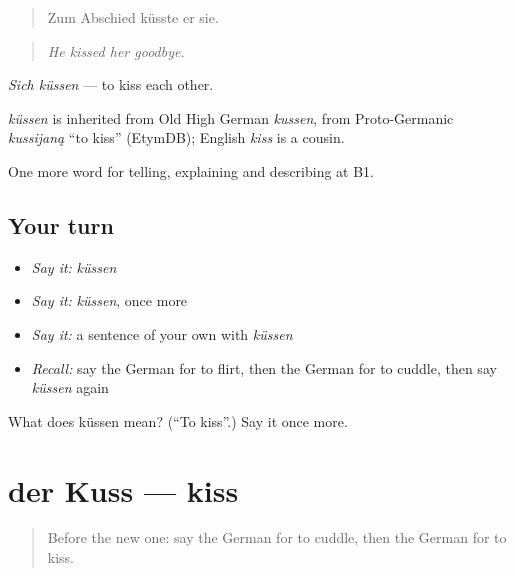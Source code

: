 \begin{quote}
Zum Abschied küsste er sie.
\end{quote}

\begin{quote}
\emph{He kissed her goodbye.}
\end{quote}

\emph{Sich küssen} — to kiss each other.

\begin{cousinweb}
\emph{küssen} is inherited from Old High German \emph{kussen}, from Proto-Germanic \emph{kussijaną} \textquotedblleft{}to kiss\textquotedblright{} (EtymDB); English \emph{kiss} is a cousin.
\end{cousinweb}

\begin{grammarlens}[title={What you've built}]
One more word for telling, explaining and describing at B1.
\end{grammarlens}

\subsection*{Your turn}
\begin{itemize}
\raggedright
  \item \emph{Say it:} \emph{küssen}
  \item \emph{Say it:} \emph{küssen}, once more
  \item \emph{Say it:} a sentence of your own with \emph{küssen}
  \item \emph{Recall:} say the German for to flirt, then the German for to cuddle, then say \emph{küssen} again
\end{itemize}

\begin{tcolorbox}[breakable,colback=teal!4,colframe=teal!35!black,title={Before you move on}]
What does küssen mean? (\textquotedblleft{}To kiss\textquotedblright{}.) Say it once more.
\end{tcolorbox}
\section[der Kuss]{der Kuss — kiss}

\label{lesson:GE-C492-kuss}



\begin{quote}
Before the new one: say the German for to cuddle, then the German for to kiss.
\end{quote}

